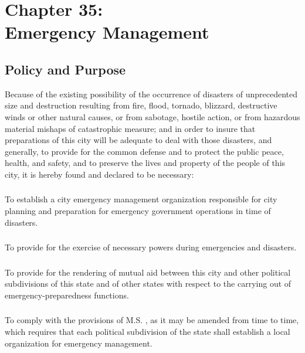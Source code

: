 \chapter*{Chapter 35: \\
	Emergency Management}
    \vfill
    \minitoc
    \pagebreak

\section{Policy and Purpose}
Because of the existing possibility of the occurrence of disasters of unprecedented size and destruction resulting from fire, flood, tornado, blizzard, destructive winds or other natural causes, or from sabotage, hostile action, or from hazardous material mishaps of catastrophic measure; and in order to insure that preparations of this city will be adequate to deal with those disasters, and generally, to provide for the common defense and to protect the public peace, health, and safety, and to preserve the lives and property of the people of this city, it is hereby found and declared to be necessary:
\subsection{}
To establish a city emergency management organization responsible for city planning and preparation for emergency government operations in time of disasters.
\subsection{}
To provide for the exercise of necessary powers during emergencies and disasters.
\subsection{}
To provide for the rendering of mutual aid between this city and other political subdivisions of this state and of other states with respect to the carrying out of emergency-preparedness functions.
\subsection{}
To comply with the provisions of M.S. , as it may be amended from time to time, which requires that each political subdivision of the state shall establish a local organization for emergency management.

